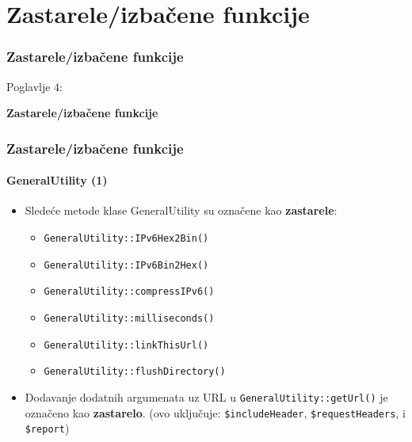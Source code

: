 %

\section{Zastarele/izbačene funkcije}
\begin{frame}[fragile]
	\frametitle{Zastarele/izbačene funkcije}

	\begin{center}\huge{Poglavlje 4:}\end{center}
	\begin{center}\huge{\color{typo3darkgrey}\textbf{Zastarele/izbačene funkcije}}\end{center}

\end{frame}


\begin{frame}[fragile]
	\frametitle{Zastarele/izbačene funkcije}
	\framesubtitle{GeneralUtility (1)}

	\begin{itemize}
		\item Sledeće metode klase GeneralUtility su označene kao \textbf{zastarele}:
			\begin{itemize}\smaller
				\item \texttt{GeneralUtility::IPv6Hex2Bin()}
				\item \texttt{GeneralUtility::IPv6Bin2Hex()}
				\item \texttt{GeneralUtility::compressIPv6()}
				\item \texttt{GeneralUtility::milliseconds()}
				\item \texttt{GeneralUtility::linkThisUrl()}
				\item \texttt{GeneralUtility::flushDirectory()}
			\end{itemize}\normalsize
			\vspace{0.4cm}

		\item Dodavanje dodatnih argumenata uz URL u \texttt{GeneralUtility::getUrl()}
			je označeno kao \textbf{zastarelo}.\newline
			\smaller
				(ovo uključuje: \texttt{\$includeHeader}, \texttt{\$requestHeaders}, i \texttt{\$report})
			\normalsize

	\end{itemize}

\end{frame}

